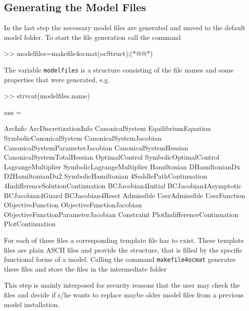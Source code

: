 \subsection{Generating the Model Files}
\label{sec:GeneratingTheModelFiles}
In the last step the necessary model files are generated and moved to the default model folder. To start the file generation call the command
\begin{matlab}
>> modelfiles=makefile4ocmat(ocStruct);(*@@*)
\end{matlab}
The variable \lstinline+modelfiles+ is a structure consisting of the file names and some properties that were generated, e.g.
\begin{matlab}
>> strvcat(modelfiles.name)

ans =

ArcInfo                           
ArcDiscretizationInfo             
CanonicalSystem                   
EquilibriumEquation               
SymbolicCanonicalSystem           
CanonicalSystemJacobian           
CanonicalSystemParameterJacobian  
CanonicalSystemHessian            
CanonicalSystemTotalHessian       
OptimalControl                    
SymbolicOptimalControl            
LagrangeMultiplier                
SymbolicLagrangeMultiplier        
Hamiltonian                       
DHamiltonianDx                    
D2HamiltonianDu2                  
SymbolicHamiltonian               
4SaddlePathContinuation           
4IndifferenceSolutionContinuation 
BCJacobian4Initial                
BCJacobian4Asymptotic             
BCJacobian4Guard                  
BCJacobian4Reset                  
Admissible                        
UserAdmissible                    
UserFunction                      
ObjectiveFunction                 
ObjectiveFunctionJacobian         
ObjectiveFunctionParameterJacobian
Constraint                        
PlotIndifferenceContinuation      
PlotContinuation          
\end{matlab}
For each of these files a corresponding template file has to exist. These template files are plain ASCII files and provide the structure, that is filled by the specific functional forms of a model. Calling the command \lstinline+makefile4ocmat+ generates these files and store the files in the intermediate folder
\begin{pathlisting}
\ocmat\model\usermodel\out
\end{pathlisting}
This step is mainly interposed for security reasons that the user may check the files and decide if s/he wants to replace maybe older model files from a previous model installation. 

